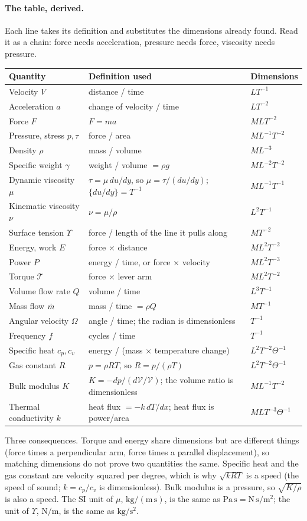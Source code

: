 \paragraph{The table, derived.} Each line takes its definition and substitutes the dimensions already found. Read it as a chain: force needs acceleration, pressure needs force, viscosity needs pressure.

\begin{center}\small
\begin{tabular}{>{\raggedright}p{3.3cm}>{\raggedright}p{6.6cm}l}
\toprule
Quantity & Definition used & Dimensions \tabularnewline
\midrule
Velocity $V$ & distance / time & $LT^{-1}$ \tabularnewline
Acceleration $a$ & change of velocity / time & $LT^{-2}$ \tabularnewline
Force $F$ & $F = ma$ & $MLT^{-2}$ \tabularnewline
Pressure, stress $p, \tau$ & force / area & $ML^{-1}T^{-2}$ \tabularnewline
Density $\rho$ & mass / volume & $ML^{-3}$ \tabularnewline
Specific weight $\gamma$ & weight / volume $= \rho g$ & $ML^{-2}T^{-2}$ \tabularnewline
Dynamic viscosity $\mu$ & $\tau = \mu\, du/dy$, so $\mu = \tau / (du/dy)$; $\{du/dy\} = T^{-1}$ & $ML^{-1}T^{-1}$ \tabularnewline
Kinematic viscosity $\nu$ & $\nu = \mu/\rho$ & $L^2T^{-1}$ \tabularnewline
Surface tension $\Upsilon$ & force / length of the line it pulls along & $MT^{-2}$ \tabularnewline
Energy, work $E$ & force $\times$ distance & $ML^2T^{-2}$ \tabularnewline
Power $P$ & energy / time, or force $\times$ velocity & $ML^2T^{-3}$ \tabularnewline
Torque $\mathcal{T}$ & force $\times$ lever arm & $ML^2T^{-2}$ \tabularnewline
Volume flow rate $Q$ & volume / time & $L^3T^{-1}$ \tabularnewline
Mass flow $\dot m$ & mass / time $= \rho Q$ & $MT^{-1}$ \tabularnewline
Angular velocity $\Omega$ & angle / time; the radian is dimensionless & $T^{-1}$ \tabularnewline
Frequency $f$ & cycles / time & $T^{-1}$ \tabularnewline
Specific heat $c_p, c_v$ & energy / (mass $\times$ temperature change) & $L^2T^{-2}\Theta^{-1}$ \tabularnewline
Gas constant $R$ & $p = \rho R T$, so $R = p/(\rho T)$ & $L^2T^{-2}\Theta^{-1}$ \tabularnewline
Bulk modulus $K$ & $K = -dp / (d\mathcal{V}/\mathcal{V})$; the volume ratio is dimensionless & $ML^{-1}T^{-2}$ \tabularnewline
Thermal conductivity $k$ & heat flux $= -k\, dT/dx$; heat flux is power/area & $MLT^{-3}\Theta^{-1}$ \tabularnewline
\bottomrule
\end{tabular}
\end{center}

Three consequences. Torque and energy share dimensions but are different things (force times a perpendicular arm, force times a parallel displacement), so matching dimensions do not prove two quantities the same. Specific heat and the gas constant are velocity squared per degree, which is why $\sqrt{kRT}$ is a speed (the speed of sound; $k = c_p/c_v$ is dimensionless). Bulk modulus is a pressure, so $\sqrt{K/\rho}$ is also a speed. The SI unit of $\mu$, $\mathrm{kg/(m\,s)}$, is the same as $\mathrm{Pa\,s} = \mathrm{N\,s/m^2}$; the unit of $\Upsilon$, $\mathrm{N/m}$, is the same as $\mathrm{kg/s^2}$.

